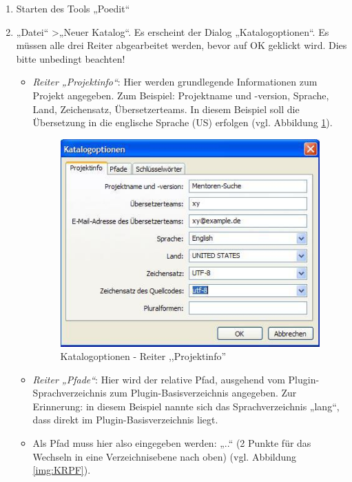 \begin{enumerate}
	\item Starten des Tools „Poedit“
	\item „Datei“ \textgreater „Neuer Katalog“. Es erscheint der Dialog „Katalogoptionen“. Es müssen alle drei Reiter abgearbeitet werden, bevor auf OK geklickt wird. Dies bitte unbedingt beachten!
	\begin{itemize}
\item \emph{Reiter „Projektinfo“}: Hier werden grundlegende Informationen zum Projekt angegeben. Zum Beispiel: Projektname und -version, Sprache, Land, Zeichensatz, Übersetzerteams. In diesem Beispiel soll die Übersetzung in die englische Sprache (US) erfolgen (vgl. Abbildung \ref{img:KRP}).
   \begin{figure}[htbp]
	\begin{center}
	\includegraphics[angle={360}, scale=0.45]{pictures/lok1.jpg}
	    \caption{Katalogoptionen - Reiter ,,Projektinfo''}
	    \label{img:KRP}
	\end{center}
   \end{figure}
   \item \emph{Reiter „Pfade“}: Hier wird der relative Pfad, ausgehend vom Plugin-Sprachverzeichnis zum  Plugin-Basisverzeichnis angegeben. Zur Erinnerung: in diesem Beispiel nannte sich das Sprachverzeichnis „lang“, dass direkt im Plugin-Basisverzeichnis liegt. 
   \item Als Pfad muss hier also eingegeben werden: „..“ (2 Punkte für das Wechseln in eine Verzeichnisebene nach oben) (vgl. Abbildung \ref{img:KRPF}).
   \begin{figure}[htbp]
	\begin{center}

\end{center}
\end{figure}
\end{itemize}
\end{enumerate}
